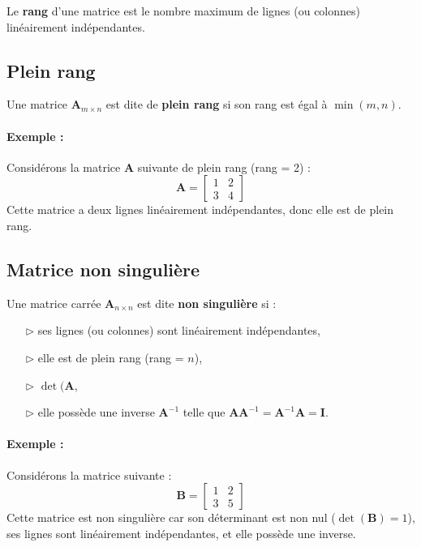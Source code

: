 \documentclass{report}
\begin{document}
\begin{multicols*}{2}
Le \textbf{rang} d'une matrice est le nombre maximum de lignes (ou colonnes) 
linéairement indépendantes.

\subsection{Plein rang}
Une matrice \(\mathbf{A}_{m \times n}\) est dite de \textbf{plein rang} si son rang 
est égal à \(\min(m, n)\).

\paragraph{Exemple :}
Considérons la matrice \(\mathbf{A}\) suivante de plein rang (rang = 2) :
\[
\mathbf{A} =
\begin{bmatrix}
1 & 2 \\
3 & 4
\end{bmatrix}
\]
Cette matrice a deux lignes linéairement indépendantes, donc elle est de plein rang.

\subsection{Matrice non singulière}
Une matrice carrée \(\mathbf{A}_{n \times n}\) est dite \textbf{non singulière} si :
\begin{itemize}
    \item[$\rhd$ ] ses lignes (ou colonnes) sont linéairement indépendantes,
    \item[$\rhd$ ] elle est de plein rang (rang = \(n\)),
    \item[$\rhd$ ] \(\det(\mathbf{A}\),
    \item[$\rhd$ ] elle possède une inverse \(\mathbf{A}^{-1}\) telle que 
    \(\mathbf{A} \mathbf{A}^{-1} = \mathbf{A}^{-1} \mathbf{A} = \mathbf{I}\).
\end{itemize}

\paragraph{Exemple :}
Considérons la matrice suivante :
\[
\mathbf{B} =
\begin{bmatrix}
1 & 2 \\
3 & 5
\end{bmatrix}
\]
Cette matrice est non singulière car son déterminant est non nul (\(\det(\mathbf{B}) = 1\)),
ses lignes sont linéairement indépendantes, et elle possède une inverse.
    
\end{multicols*}
\end{document}
